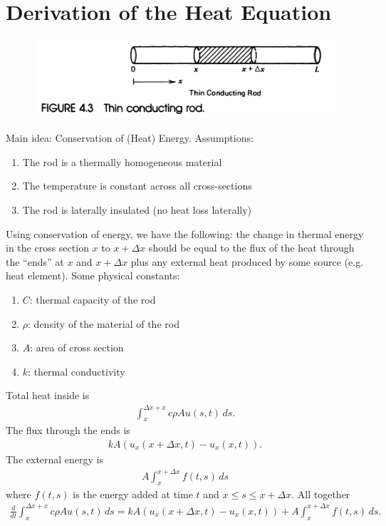 \documentclass{article}
\theoremstyle{definition}
\begin{document}
\section{Derivation of the Heat Equation}
\begin{figure}[h!]
	\centering
	\includegraphics[scale=0.3]{heat.png}
\end{figure}
Main idea: Conservation of (Heat) Energy. Assumptions:
\begin{enumerate}
	\item The rod is a thermally homogeneous material 
	\item The temperature is constant across all cross-sections
	\item The rod is laterally insulated (no heat loss laterally)
\end{enumerate}
Using conservation of energy, we have the following: the change in thermal energy in the cross section $x$ to $x+\Delta x$ should be equal to the flux of the heat through the ``ends'' at $x$ and $x+\Delta x$ plus any external heat produced by some source (e.g. heat element). Some physical constants:
\begin{enumerate}
	\item $C$: thermal capacity of the rod
	\item $\rho$: density of the material of the rod
	\item $A$: area of cross section
	\item $k$: thermal conductivity
\end{enumerate}
Total heat inside is
\begin{align*}
\int_{x}^{\Delta x + x}c\rho A u(s,t)\,ds.
\end{align*}
The flux through the ends is
\begin{align*}
kA(u_x(x+\Delta x,t) - u_x(x, t)).
\end{align*}
The external energy is
\begin{align*}
A\int_x^{x+\Delta x}f(t,s)\,ds
\end{align*}
where $f(t,s)$ is the energy added at time $t$ and $x\leq s \leq x+\Delta x$. All together
\begin{align*}
\frac{d}{dt}\int_{x}^{\Delta x + x}c\rho A u(s,t)\,ds = kA(u_x(x+\Delta x,t) - u_x(x, t)) + A\int_x^{x+\Delta x}f(t,s)\,ds.
\end{align*}
\end{document}
